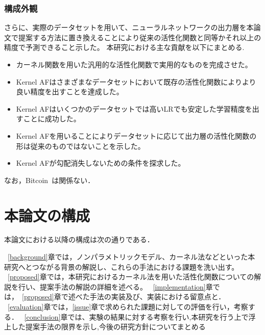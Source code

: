 \subsubsection{構成外観}

さらに、実際のデータセットを用いて、ニューラルネットワークの出力層を本論文で提案する方法に置き換えることにより従来の活性化関数と同等かそれ以上の精度で予測できること示した。
本研究における主な貢献を以下にまとめる.

\begin{itemize}
  \item カーネル関数を用いた汎用的な活性化関数で実用的なものを完成させた。
  \item Kernel AFはさまざまなデータセットにおいて既存の活性化関数によりより良い精度を出すことを達成した。
  \item Kernel AFはいくつかのデータセットでは高いLRでも安定した学習精度を出すことに成功した。
  \item Kernel AFを用いることによりデータセットに応じて出力層の活性化関数の形は従来のものではないことを示した。
  \item Kernel AFが勾配消失しないための条件を探求した。
\end{itemize}


なお，Bitcoin~\cite{Bitcoin}は関係ない．

\section{本論文の構成}

本論文における以降の構成は次の通りである．

~\ref{background}章では，ノンパラメトリックモデル、カーネル法などといった本研究へとつながる背景の解説し、これらの手法における課題を洗い出す。
~\ref{proposed}章では，本研究におけるカーネル法を用いた活性化関数についての解説を行い、提案手法の解説の詳細を述べる。
~\ref{implementation}章では，~\ref{proposed}章で述べた手法の実装及び、実装における留意点と．
~\ref{evaluation}章では，\ref{issue}章で求められた課題に対しての評価を行い，考察する．
~\ref{conclusion}章では、実験の結果に対する考察を行い,本研究を行う上で浮上した提案手法の限界を示し,今後の研究方針についてまとめる






